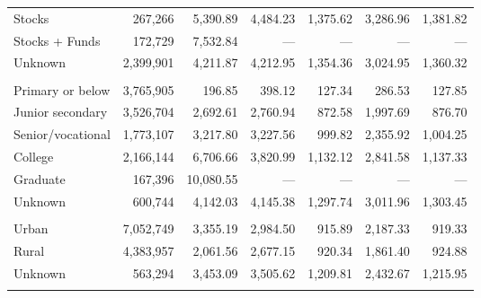 \documentclass[10pt]{article}
\begin{document}
\begin{center}
\begin{minipage}{\textwidth}
\begin{tabularx}{\textwidth}{@{}Xrrrrrr@{}}
Stocks & 267,266 & 5,390.89 & 4,484.23 & 1,375.62 & 3,286.96 & 1,381.82 \\

Stocks + Funds & 172,729 & 7,532.84 & --- & --- & --- & --- \\

Unknown & 2,399,901 & 4,211.87 & 4,212.95 & 1,354.36 & 3,024.95 & 1,360.32 \\

\addlinespace[3pt]
\multicolumn{7}{l}{\textit{Education}} \\

Primary or below & 3,765,905 & 196.85 & 398.12 & 127.34 & 286.53 & 127.85 \\

Junior secondary & 3,526,704 & 2,692.61 & 2,760.94 & 872.58 & 1,997.69 & 876.70 \\

Senior/vocational & 1,773,107 & 3,217.80 & 3,227.56 & 999.82 & 2,355.92 & 1,004.25 \\

College & 2,166,144 & 6,706.66 & 3,820.99 & 1,132.12 & 2,841.58 & 1,137.33 \\

Graduate & 167,396 & 10,080.55 & --- & --- & --- & --- \\

Unknown & 600,744 & 4,142.03 & 4,145.38 & 1,297.74 & 3,011.96 & 1,303.45 \\

\addlinespace[3pt]
\multicolumn{7}{l}{\textit{Urban/rural residence}} \\

Urban & 7,052,749 & 3,355.19 & 2,984.50 & 915.89 & 2,187.33 & 919.33 \\

Rural & 4,383,957 & 2,061.56 & 2,677.15 & 920.34 & 1,861.40 & 924.88 \\

Unknown & 563,294 & 3,453.09 & 3,505.62 & 1,209.81 & 2,432.67 & 1,215.95 \\

\addlinespace[3pt]
\bottomrule\end{tabularx}
\par{}
\end{minipage}\end{center}
\end{document}
